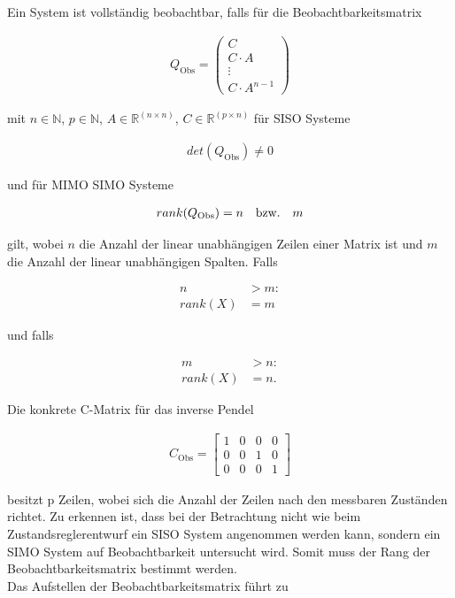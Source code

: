 Ein System ist vollständig beobachtbar, falls für die Beobachtbarkeitsmatrix

\begin{align}
    Q_{\mathrm{Obs}} =
    \begin{pmatrix}
        C \\
        C \cdot A \\
        \vdots \\
        C \cdot A^{n - 1}
    \end{pmatrix}
\end{align}

mit $n\in\mathbb{N}$, $p\in\mathbb{N}$, $A\in\mathbb{R}^{(n\times n)}$, $C\in\mathbb{R}^{(p\times n)}$ für SISO Systeme

\begin{align}
    det(Q_{\mathrm{Obs}}) \neq 0
\end{align}

und für MIMO \bzw SIMO Systeme

\begin{align}
    rank(Q_{\mathrm{Obs}}) = n \quad \text{bzw.} \quad m
\end{align}

gilt, wobei $n$ die Anzahl der linear unabhängigen Zeilen einer Matrix ist und $m$ die Anzahl der linear unabhängigen Spalten. Falls

\begin{align*}
    n &> m: \\
    rank(X) &= m
\end{align*}

und falls

\begin{align*}
    m &> n: \\
    rank(X) &= n.
\end{align*}

Die konkrete C-Matrix für das inverse Pendel

\begin{align}
    C_{\mathrm{Obs}} = 
    \begin{bmatrix}
        1 & 0 & 0 & 0 \\
        0 & 0 & 1 & 0 \\
        0 & 0 & 0 & 1
    \end{bmatrix}
\end{align}

besitzt p Zeilen, wobei sich die Anzahl der Zeilen nach den messbaren Zuständen richtet. Zu erkennen ist, dass bei der Betrachtung nicht wie beim Zustandsreglerentwurf ein SISO System angenommen werden kann, sondern ein SIMO System auf Beobachtbarkeit untersucht wird. Somit muss der Rang der Beobachtbarkeitsmatrix bestimmt werden.\\
Das Aufstellen der Beobachtbarkeitsmatrix führt zu

